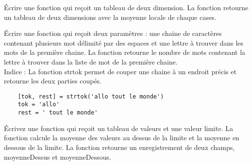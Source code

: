 \documentclass[french]{article}
\begin{document}
    \vfill
    \begin{solution}
        
    \end{solution}
    \newpage
    \begin{question}{10}
    Écrire une fonction qui reçoit un tableau de deux dimension. La fonction retourne un tableau de deux dimensions avec la moyenne locale de chaque cases.
    \end{question}
    \vfill
    \begin{solution}
        
    \end{solution}
    \newpage
    \begin{question}{15}
    Écrire une fonction qui reçoit deux paramètres : une chaine de caractères contenant plusieurs mot délimité par des espaces et une lettre à trouver dans les mots de la première chaine. La fonction retourne le nombre de mots contenant la lettre à trouver dans la liste de mot de la première chaine.
    \\Indice : La fonction strtok permet de couper une chaine à un endroit précis et retourne les deux parties coupés.
    \end{question}
    \begin{lstlisting}
    [tok, rest] = strtok('allo tout le monde')
    tok = 'allo'
    rest = ' tout le monde'
    \end{lstlisting}
    \vfill
    \begin{solution}
        
    \end{solution}
    \newpage
    \begin{question}{15}
        Écrivez une fonction qui reçoit un tableau de valeurs et une valeur limite. La fonction calcule la moyenne des valeurs au dessus de la limite et la moyenne en dessous de la limite. La fonction retourne un enregistrement de deux champs, moyenneDessus et moyenneDessous.
    \end{question}
    \vfill
    \begin{solution}
        
    \end{solution}
    
\end{document}

